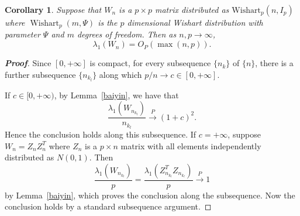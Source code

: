 \documentclass[review]{elsarticle}
\theoremstyle{plain}
\newtheorem{corollary}{\quad\quad Corollary}
\theoremstyle{definition}
\theoremstyle{remark}
\begin{document}
\begin{corollary}\label{maxEigen}
    Suppose that $W_n$ is a $p \times p$ matrix distributed as $\mathrm{Wishart}_p(n,I_{p})$ where $\operatorname{Wishart}_p(m,\Psi)$ is the $p$ dimensional Wishart distribution with parameter $\Psi$ and $m$ degrees of freedom. Then as $n,p\to \infty$,
    $$
        \lambda_1(W_n)=O_P(\max(n,p)).
    $$
\end{corollary}
\begin{proof}[\textbf{Proof}]
    Since $[0,+\infty]$ is compact, for every subsequence $\{n_{k}\}$ of $\{n\}$, there is a further subsequence $\{n_{k_l}\}$ along which $p/n\to c\in [0,+\infty]$.

    If $c\in [0,+\infty)$, by Lemma~\ref{baiyin}, we have that
    $$
    \frac{\lambda_1(W_{n_{k_l}})}{n_{k_l}}\xrightarrow{P}{(1+c)}^2.
    $$
    Hence the conclusion holds along this subsequence.
    If $c=+\infty$, suppose $W_n=Z_n Z_n^T$ where $Z_n$ is a $p\times n$ matrix with all elements independently distributed as $N(0,1)$. Then
    $$
    \frac{\lambda_1(W_{n_{k_l}})}{p}=\frac{\lambda_1(Z_{n_{k_l}}^T Z_{n_{k_l}})}{p}\xrightarrow{P} 1
    $$
    by Lemma~\ref{baiyin}, which proves the conclusion along the subsequence. Now the conclusion holds by a standard subsequence argument.
\end{proof}
\end{document}
